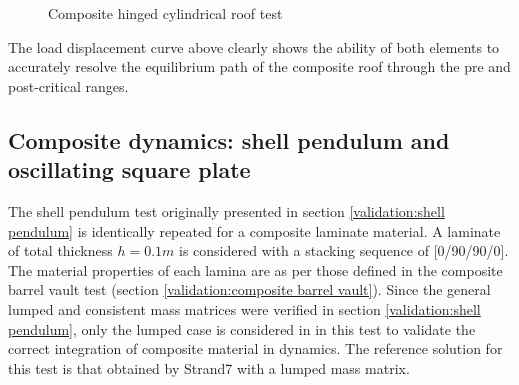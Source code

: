 \begin{figure}[H]
	\caption{\label{ref_label_overall}Composite hinged cylindrical roof test}
\end{figure}

The load displacement curve above clearly shows the ability of both elements to accurately resolve the equilibrium path of the composite roof through the pre and post-critical ranges.

\subsection{Composite dynamics: shell pendulum and oscillating square plate}

The shell pendulum test originally presented in section \ref{validation:shell pendulum} is identically repeated for a composite laminate material. A laminate of total thickness $h = 0.1m$ is considered with a stacking sequence of [0/90/90/0]. The material properties of each lamina are as per those defined in the composite barrel vault test (section \ref{validation:composite barrel vault}). Since the general lumped and consistent mass matrices were verified in section \ref{validation:shell pendulum}, only the lumped case is considered in in this test to validate the correct integration of composite material in dynamics. The reference solution for this test is that obtained by Strand7 with a lumped mass matrix.

